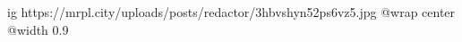  
 
 
 
 

\ifcmt
  ig https://mrpl.city/uploads/posts/redactor/3hbvshyn52ps6vz5.jpg
  @wrap center
  @width 0.9
\fi
